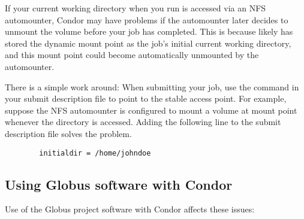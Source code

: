 If your current working directory when you run 
is accessed via an NFS automounter, Condor may have problems if the
automounter later decides to unmount the volume before your job has
completed.
This is because  likely has stored the
dynamic mount point as the job's initial current working directory, and
this mount point could become automatically unmounted by the
automounter.

There is a simple work around: When submitting your job, use the 
 command in your submit description file to point to
the stable access point.
For example,
suppose the NFS automounter is configured to mount a volume at mount point
whenever the directory  is accessed.
Adding the following line to the
submit description file solves the problem.
\begin{verbatim}
        initialdir = /home/johndoe
\end{verbatim}

\subsection{Using Globus software with Condor}
Use of the Globus project software  with
Condor affects these issues:

